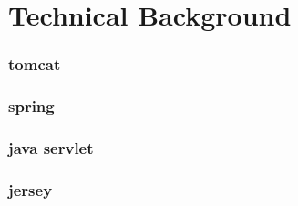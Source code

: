 \part{Technical Background}
\label{part:technical}

\section{tomcat}

\section{spring}

\section{java servlet}

\section{jersey}